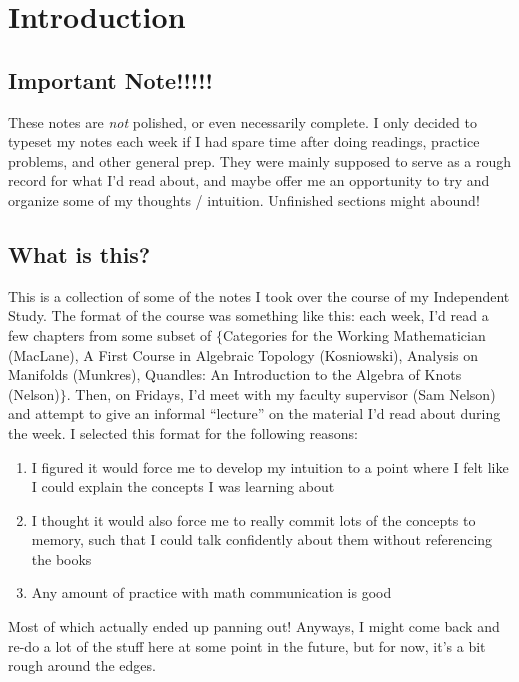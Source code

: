 \documentclass{fkbook}
\theoremstyle{snazzydefinition}
\begin{document}
\pagestyle{plain}
\frontmatter


\maketitlepage
\tableofcontents
\mainmatter
\chapter{Introduction}
\pagestyle{main}
\section*{Important Note!!!!!}
These notes are \emph{not} polished, or even necessarily complete. I only
decided to typeset my notes each week if I had spare time after doing readings,
practice problems, and other general prep. They were mainly supposed to serve as
a rough record for what I'd read about, and maybe offer me an opportunity to try
and organize some of my thoughts / intuition. Unfinished sections might abound!

\section*{What is this?}
This is a collection of some of the notes I took over the course of my
Independent Study. The format of the course was something like this: each week,
I'd read a few chapters from some subset of $\{$Categories for the Working
Mathematician (MacLane), A First Course in Algebraic Topology (Kosniowski),
Analysis on Manifolds (Munkres), Quandles: An Introduction to the Algebra of
Knots (Nelson)$\}$. Then, on Fridays, I'd meet with my faculty supervisor (Sam
Nelson) and attempt to give an informal ``lecture'' on the material I'd read
about during the week. I selected this format for the following reasons:
\begin{enumerate}
  \item I figured it would force me to develop my intuition to a point where I
    felt like I could explain the concepts I was learning about
  \item I thought it would also force me to really commit lots of the concepts
    to memory, such that I could talk confidently about them without referencing
    the books
  \item Any amount of practice with math communication is good
\end{enumerate}
Most of which actually ended up panning out! Anyways, I might come back and
re-do a lot of the stuff here at some point in the future, but for now, it's a
bit rough around the edges.
\end{document}

